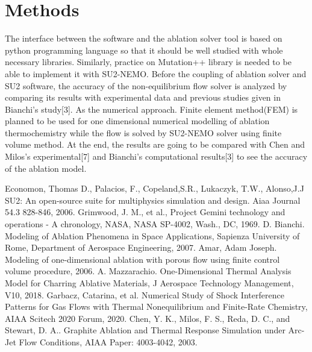 \documentclass[12pt]{article}
\begin{document}
\section{Methods}
The interface between the software and the ablation solver tool is based on python programming language so that it should be well studied with whole necessary libraries. Similarly, practice on Mutation++ library is needed to be able to implement it with SU2-NEMO. Before the coupling of ablation solver and SU2 software, the accuracy of the non-equilibrium flow solver is analyzed by comparing its results with experimental data and previous studies given in Bianchi’s study[3].\newline
As the numerical approach. Finite element method(FEM) is planned to be used for one dimensional numerical modelling of ablation thermochemistry while the flow is solved by SU2-NEMO solver using finite volume method. At the end, the results are going to be compared with Chen and Milos’s experimental[7] and Bianchi’s computational results[3] to see the accuracy of the ablation model. 



\begin{thebibliography}{99}
 Economon, Thomas D., Palacios, F., Copeland,S.R., Lukaczyk, T.W., Alonso,J.J
SU2: An open-source suite for multiphysics simulation and design.
Aiaa Journal 54.3 828-846, 2006.
  Grimwood, J. M., et al., Project Gemini technology and operations - A chronology, NASA, NASA SP-4002, Wash., DC, 1969.
  D. Bianchi. Modeling of Ablation Phenomena in Space Applications,
   Sapienza University of Rome, Department of Aerospace Engineering, 2007.
 Amar, Adam Joseph. 
Modeling of one-dimensional ablation with porous flow using finite control volume procedure, 2006.
  A. Mazzarachio.
 One-Dimensional Thermal Analysis Model for Charring Ablative Materials,
  J Aerospace Technology Management, V10,
  2018. 
 Garbacz, Catarina, et al. 
Numerical Study of Shock Interference Patterns for Gas Flows with Thermal Nonequilibrium and Finite-Rate Chemistry, AIAA Scitech 2020 Forum, 2020.
 Chen, Y. K., Milos, F. S., Reda, D. C., and Stewart, D. A..
Graphite Ablation and Thermal Response Simulation under Arc-Jet Flow Conditions, AIAA Paper: 4003-4042, 2003.
\end{thebibliography}
\end{document}
